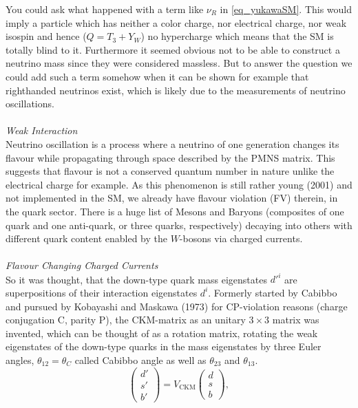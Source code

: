 You could ask
what happened with a term like $\nu_R$ in \eqref{eq_yukawaSM}. This would imply a particle which has neither a color charge, nor electrical charge, nor 
weak isospin and hence ($Q = T_3 + Y_W$) no hypercharge which means that the SM is totally blind to it. Furthermore it seemed obvious not to be
able to construct a neutrino mass since they were considered massless. But to answer the question we could add 
such a term somehow when it can be shown for example that righthanded neutrinos exist, which is likely due to the measurements of neutrino oscillations.
\\ \\ \textit{Weak Interaction}\\
\noindent Neutrino oscillation is a process where a neutrino of one generation changes its flavour while propagating through space described by the PMNS matrix. 
This suggests that 
flavour is not a conserved quantum number in nature unlike the electrical charge for example. As this phenomenon is still rather young (2001) and not implemented in the 
SM, we already have flavour violation (FV) therein, in the quark sector. There is a huge list of Mesons and Baryons (composites of one quark and one anti-quark,
or three quarks, respectively) decaying into others with different quark content enabled by the $W$-bosons via charged currents. 
\\ \\ \textit{Flavour Changing Charged Currents}\\
\noindent So it was thought, that the down-type quark mass
eigenstates $d'^i$ are superpositions of their interaction eigenstates $d^i$. Formerly started by Cabibbo and pursued by 
Kobayashi and Maskawa (1973) for CP-violation reasons (charge conjugation C, parity P), the CKM-matrix as an unitary $3\times 3$ matrix was invented,
which can be thought of as a rotation
matrix, rotating the weak eigenstates of the down-type quarks in the mass eigenstates by three Euler angles, $\theta_{12} = \theta_C$ called Cabibbo angle 
as well as $\theta_{23}$ and $\theta_{13}$.
\begin{equation}
 \begin{pmatrix}
  d' \\ s' \\ b'
 \end{pmatrix} = V_\text{CKM}  \begin{pmatrix}
  d \\ s \\ b
 \end{pmatrix},
\end{equation}
